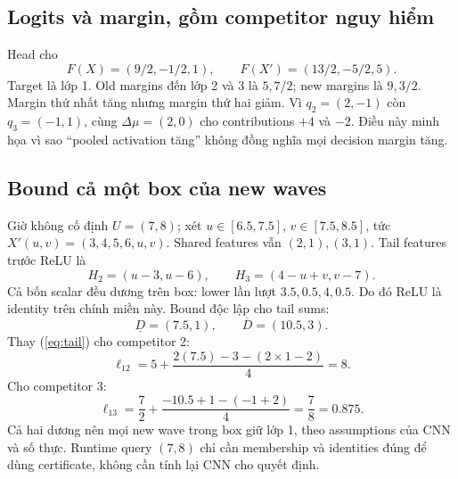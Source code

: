 \documentclass[11pt,a4paper]{article}
\theoremstyle{definition}
\begin{document}
\subsection{Logits và margin, gồm competitor nguy hiểm}
Head cho
\begin{equation}
F(X)=(9/2,-1/2,1),\qquad F(X')=(13/2,-5/2,5).
\end{equation}
Target là lớp 1. Old margins đến lớp 2 và 3 là $5,7/2$; new margins
là $9,3/2$. Margin thứ nhất tăng nhưng margin thứ hai giảm. Vì
$q_2=(2,-1)$ còn $q_3=(-1,1)$, cùng $\Delta\mu=(2,0)$ cho contributions
$+4$ và $-2$. Điều này minh họa vì sao ``pooled activation tăng'' không
đồng nghĩa mọi decision margin tăng.

\subsection{Bound cả một box của new waves}
Giờ không cố định $U=(7,8)$; xét $u\in[6.5,7.5]$, $v\in[7.5,8.5]$,
tức $X'(u,v)=(3,4,5,6,u,v)$. Shared features vẫn $(2,1),(3,1)$.
Tail features trước ReLU là
\begin{equation}
H_2=(u-3,u-6),\qquad H_3=(4-u+v,v-7).
\end{equation}
Cả bốn scalar đều dương trên box: lower lần lượt $3.5,0.5,4,0.5$.
Do đó ReLU là identity trên chính miền này. Bound độc lập cho tail sums:
\begin{equation}
\underline D=(7.5,1),\qquad\overline D=(10.5,3).
\end{equation}
Thay (\ref{eq:tail}) cho competitor 2:
\begin{equation}
\ell_{12}=5+\frac{2(7.5)-3-(2\times1-2)}4=8.
\end{equation}
Cho competitor 3:
\begin{equation}
\ell_{13}=\frac72+\frac{-10.5+1-(-1+2)}4=\frac78=0.875.
\end{equation}
Cả hai dương nên mọi new wave trong box giữ lớp 1, theo assumptions của
CNN và số thực. Runtime query $(7,8)$ chỉ cần membership và identities
đúng để dùng certificate, không cần tính lại CNN cho quyết định.
\end{document}

